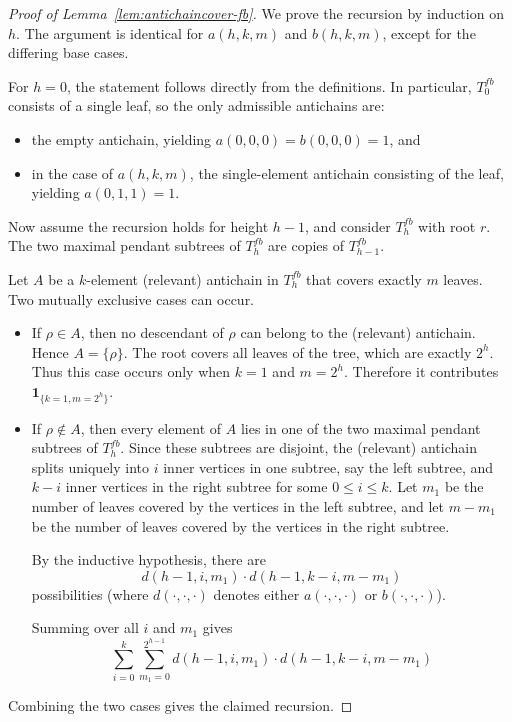 \documentclass{amsart}
\theoremstyle{definition}
\begin{document}
\begin{proof}[Proof of Lemma~\ref{lem:antichaincover-fb}]
We prove the recursion by induction on $h$. The argument is identical for $a(h,k,m)$ and $b(h,k,m)$, except for the differing base cases.

For $h=0$, the statement follows directly from the definitions. In particular, $T_0^{fb}$ consists of a single leaf, so the only admissible antichains are:
    \begin{itemize}
        \item the empty antichain, yielding $a(0,0,0)=b(0,0,0)=1$, and
        \item in the case of $a(h,k,m)$, the single-element antichain consisting of the leaf, yielding $a(0,1,1)=1$.
    \end{itemize}

Now assume the recursion holds for height $h-1$, and consider $T_h^{fb}$ with root $r$. The two maximal pendant subtrees of $T_h^{fb}$ are copies of $T_{h-1}^{fb}$.

Let $A$ be a $k$-element (relevant) antichain in $T_h^{fb}$ that covers exactly $m$ leaves. Two mutually exclusive cases can occur.
\begin{itemize}
    \item If $\rho \in A$, then no descendant of $\rho$ can belong to the (relevant) antichain. Hence $A = \{\rho\}$. The root covers all leaves of the tree, which are exactly $2^h$. Thus this case occurs only when $k=1$ and $m=2^h$. Therefore it contributes $\mathbf{1}_{\{k=1,m=2^h\}}$.

    \item If $\rho \notin A$, then every element of $A$ lies in one of the two maximal pendant subtrees of $T_h^{fb}$. Since these subtrees are disjoint, the (relevant) antichain splits uniquely into $i$ inner vertices in one subtree, say the left subtree, and $k-i$ inner vertices in the right subtree for some $0 \leq i \leq k$. Let $m_1$ be the number of leaves covered by the vertices in the left subtree, and let $m-m_1$ be the number of leaves covered by the vertices in the right subtree. 
    
    By the inductive hypothesis, there are  
    \[ d(h-1,i,m_1) \cdot d(h-1,k-i,m-m_1)\]
    possibilities (where $d(\cdot, \cdot, \cdot)$ denotes either $a(\cdot, \cdot, \cdot)$ or $b(\cdot, \cdot, \cdot)$).

    Summing over all $i$ and $m_1$ gives
    \[ \sum\limits_{i=0}^{k} \sum\limits_{m_1=0}^{2^{h-1}} d(h-1,i,m_1) \cdot d(h-1,k-i,m-m_1)\]
\end{itemize}
Combining the two cases gives the claimed recursion.
\end{proof}
\end{document}
